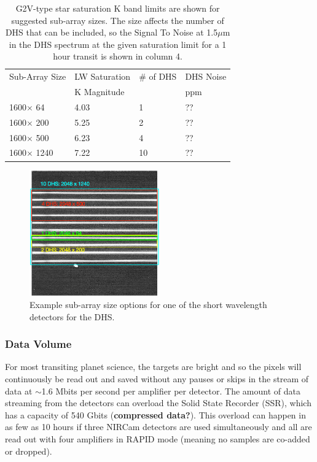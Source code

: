 \documentclass{emulateapj}
\begin{document}
\begin{table}
\centering
\begin{tabular}{llll}
Sub-Array Size &  LW Saturation & \# of DHS & DHS Noise\\
                         &  K Magnitude    &                               & ppm \\
\hline \hline
1600$\times$ 64 & 4.03 & 1 &  ?? \\
1600$\times$ 200 & 5.25 & 2 &  ?? \\
1600$\times$ 500 & 6.23 & 4 &  ?? \\
1600$\times$ 1240 & 7.22 & 10 & ??
\end{tabular}
\caption{G2V-type star saturation K band limits are shown for suggested sub-array sizes. The size affects the number of DHS that can be included, so the Signal To Noise at 1.5$\mu$m in the DHS spectrum at the given saturation limit for a 1 hour transit is shown in column 4.}\label{tab:SatSNRsubA}
\end{table}

\begin{figure}[!ht]
\includegraphics[width=0.5\textwidth]{example_ap_sizes.png}
\caption{Example sub-array size options for one of the short wavelength detectors for the DHS.}\label{fig:DHSaps}
\end{figure}

\subsubsection{Data Volume}
For most transiting planet science, the targets are bright and so the pixels will continuously be read out and saved without any pauses or skips in the stream of data at $\sim$1.6 Mbits per second per amplifier per detector. The amount of data streaming from the detectors can overload the Solid State Recorder (SSR), which has a capacity of 540 Gbits \citep{johns2008L2comm} (\textbf{compressed data?}). This overload can happen in as few as 10 hours if three NIRCam detectors are used simultaneously and all are read out with four amplifiers in RAPID mode (meaning no samples are co-added or dropped).
\end{document}
